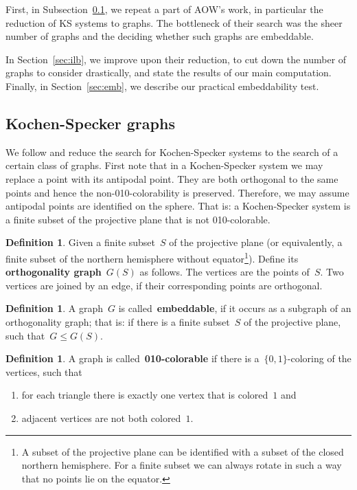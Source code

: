 \documentclass[adraft,copyright,creativecommons]{eptcs}
\newcommand{\keyword}[1]{\textbf{#1}}
\newcounter{main}
\theoremstyle{definition}
\newtheorem{dfn}[main]{Definition}
\theoremstyle{remark}
\begin{document}
First, in Subsection~\ref{sec:ksgraphs},
we repeat a part of AOW's work, in particular the reduction of
KS systems to graphs.
The bottleneck of their search was the sheer number of graphs
and the deciding whether such graphs are embeddable.

In Section~\ref{sec:ilb},
we improve upon their reduction,
to cut down the number of graphs to consider drastically,
and state the results of our main computation.
Finally, in Section~\ref{sec:emb},
we describe our practical embeddability test.

\subsection{Kochen-Specker graphs}
\label{sec:ksgraphs}
We follow \cite{aow11} and reduce the search for Kochen-Specker systems
to the search of a certain class of graphs.
First note that in a Kochen-Specker system we may replace a point with its
antipodal point.  They are both orthogonal to the same points and hence
the non-010-colorability is preserved.
Therefore, we may assume antipodal points are identified on the sphere.
That is: a Kochen-Specker system is a finite subset of the projective plane
that is not 010-colorable.

\begin{dfn}
Given a finite subset~$S$ of the projective plane
(or equivalently, a finite subset of the northern
hemisphere without equator\footnote{%
    A subset of the projective plane can be identified with
    a subset of the closed northern hemisphere.
    For a finite subset we can always rotate in such a way
    that no points lie on the equator.}).
Define its \keyword{orthogonality graph}~$G(S)$ as follows.
The vertices are the points of~$S$.
Two vertices are joined by an edge, if their corresponding points
are orthogonal.
\end{dfn}
\begin{dfn}
A graph~$G$ is called~\keyword{embeddable},
if it occurs as a subgraph of an orthogonality graph;
that is: if there is a finite subset~$S$ of the projective plane,
such that~$G \leq G(S)$.
\end{dfn}
\begin{dfn}
A graph is called~\keyword{010-colorable}
if there is a~$\{0,1\}$-coloring of the vertices,
such that
\begin{enumerate}
\item
for each triangle there is exactly one vertex that is colored~$1$ and
\item
adjacent vertices are not both colored~$1$.
\end{enumerate}
\end{dfn}
\end{document}
